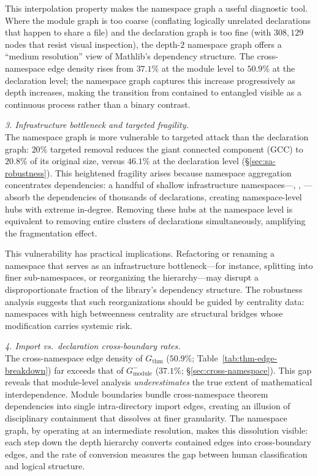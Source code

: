 This interpolation property makes the namespace graph a useful diagnostic tool. Where the module graph is too coarse (conflating logically unrelated declarations that happen to share a file) and the declaration graph is too fine (with $308{,}129$ nodes that resist visual inspection), the depth-$2$ namespace graph offers a ``medium resolution'' view of Mathlib's dependency structure. The cross-namespace edge density rises from $37.1\%$ at the module level to $50.9\%$ at the declaration level; the namespace graph captures this increase progressively as depth increases, making the transition from contained to entangled visible as a continuous process rather than a binary contrast.

\medskip
\noindent \textit{3. Infrastructure bottleneck and targeted fragility.} \\
The namespace graph is more vulnerable to targeted attack than the declaration graph: $20\%$ targeted removal reduces the giant connected component (GCC) to $20.8\%$ of its original size, versus $46.1\%$ at the declaration level (\S\ref{sec:sa-robustness}). This heightened fragility arises because namespace aggregation concentrates dependencies: a handful of shallow infrastructure namespaces---, , ---absorb the dependencies of thousands of declarations, creating namespace-level hubs with extreme in-degree. Removing these hubs at the namespace level is equivalent to removing entire clusters of declarations simultaneously, amplifying the fragmentation effect.

This vulnerability has practical implications. Refactoring or renaming a namespace that serves as an infrastructure bottleneck---for instance, splitting  into finer sub-namespaces, or reorganizing the  hierarchy---may disrupt a disproportionate fraction of the library's dependency structure. The robustness analysis suggests that such reorganizations should be guided by centrality data: namespaces with high betweenness centrality are structural bridges whose modification carries systemic risk.

\medskip
\noindent \textit{4. Import vs.\ declaration cross-boundary rates.}\label{rem:import-vs-decl-cross} \\
The cross-namespace edge density of $G_{\mathrm{thm}}$ ($50.9\%$; Table~\ref{tab:thm-edge-breakdown}) far exceeds that of $G_{\mathrm{module}}^{-}$ ($37.1\%$; \S\ref{sec:cross-namespace}). This gap reveals that module-level analysis \emph{underestimates} the true extent of mathematical interdependence. Module boundaries bundle cross-namespace theorem dependencies into single intra-directory import edges, creating an illusion of disciplinary containment that dissolves at finer granularity. The namespace graph, by operating at an intermediate resolution, makes this dissolution visible: each step down the depth hierarchy converts contained edges into cross-boundary edges, and the rate of conversion measures the gap between human classification and logical structure.

